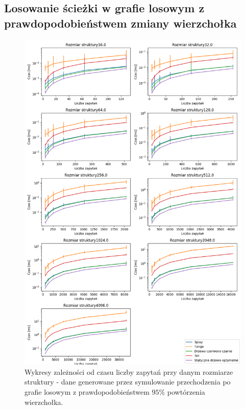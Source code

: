 \documentclass[declaration,shortabstract]{iithesis}
\theoremstyle{thm}
\theoremstyle{remark}
\theoremstyle{plain}
\theoremstyle{plain}
\theoremstyle{plain}
\begin{document}
\subsection{Losowanie ścieżki w grafie losowym z prawdopodobieństwem zmiany wierzchołka}
\begin{figure}[H]  

\centering
    \includegraphics[scale=0.5]{wykresy/randwalk5.png}
      \caption{Wykresy zależności od czasu liczby zapytań przy danym rozmiarze struktury - dane generowane przez symulowanie przechodzenia po grafie losowym z prawdopodobieństwem  \(95\%\) powtórzenia wierzchołka. }  
    \label{fig:zigzig} 
\end{figure}
\end{document}
